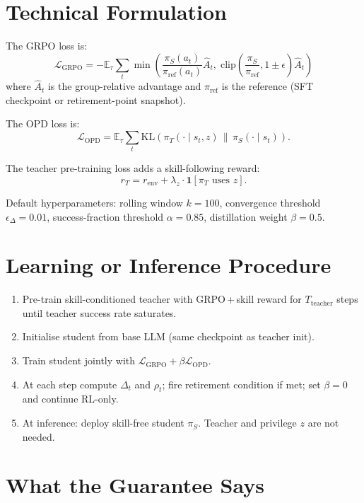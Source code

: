 \documentclass[10pt,twocolumn]{article}
\begin{document}
\section{Technical Formulation}

The GRPO loss is:
\[
\mathcal{L}_{\text{GRPO}} = -\mathbb{E}_\tau\sum_t \min\!\left(
  \frac{\pi_S(a_t)}{\pi_{\text{ref}}(a_t)}\hat{A}_t,\;
  \text{clip}\!\left(\frac{\pi_S}{\pi_{\text{ref}}}, 1\pm\epsilon\right)\hat{A}_t
\right)
\]
where $\hat{A}_t$ is the group-relative advantage and $\pi_{\text{ref}}$ is
the reference (SFT checkpoint or retirement-point snapshot).

The OPD loss is:
\[
\mathcal{L}_{\text{OPD}} =
  \mathbb{E}_\tau\sum_t
  \mathrm{KL}\!\left(\pi_T(\cdot \mid s_t, z)\,\big\|\,\pi_S(\cdot\mid s_t)\right).
\]

The teacher pre-training loss adds a skill-following reward:
\[
r_T = r_{\text{env}} + \lambda_z \cdot \mathbf{1}\!\left[\pi_T \text{ uses } z\right].
\]

Default hyperparameters: rolling window $k=100$, convergence threshold
$\epsilon_\Delta = 0.01$, success-fraction threshold $\alpha = 0.85$,
distillation weight $\beta = 0.5$.

\section{Learning or Inference Procedure}

\begin{enumerate}[itemsep=2pt,parsep=0pt]
  \item Pre-train skill-conditioned teacher with GRPO\,+\,skill reward for
    $T_{\text{teacher}}$ steps until teacher success rate saturates.
  \item Initialise student from base LLM (same checkpoint as teacher init).
  \item Train student jointly with $\mathcal{L}_{\text{GRPO}} + \beta\mathcal{L}_{\text{OPD}}$.
  \item At each step compute $\Delta_t$ and $\rho_t$; fire retirement
    condition if met; set $\beta{=}0$ and continue RL-only.
  \item At inference: deploy skill-free student $\pi_S$. Teacher and
    privilege $z$ are not needed.
\end{enumerate}

\section{What the Guarantee Says}
\end{document}
